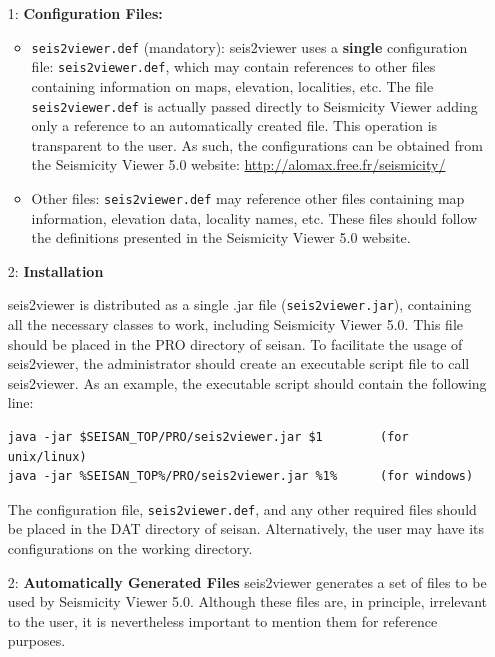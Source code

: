 \begin{enumerate}
\item[1:] \textbf{Configuration Files:}

\begin{itemize}
\item \texttt{seis2viewer.def} (mandatory): seis2viewer uses a \textbf{single} configuration file: \texttt{seis2viewer.def}, which may contain references to other files containing information on maps, elevation, localities, etc. The file \texttt{seis2viewer.def} is actually passed directly to Seismicity Viewer adding only a reference to an automatically created file. This operation is transparent to the user. As such, the configurations can be obtained from the Seismicity Viewer 5.0 website: \url{http://alomax.free.fr/seismicity/}
\item Other files: \texttt{seis2viewer.def} may reference other files containing map information, elevation data, locality names, etc. These files should follow the definitions presented in the Seismicity Viewer 5.0 website.
\end{itemize}


\item[2:] \textbf{Installation}

seis2viewer is distributed as a single .jar file (\texttt{seis2viewer.jar}), containing all the necessary classes to work, including Seismicity Viewer 5.0. This file should be placed in the PRO directory of seisan.
To facilitate the usage of seis2viewer, the administrator should create an executable script file to call seis2viewer. As an example, the executable script should contain the following line:

\begin{verbatim}
java -jar $SEISAN_TOP/PRO/seis2viewer.jar $1        (for unix/linux)
java -jar %SEISAN_TOP%/PRO/seis2viewer.jar %1%      (for windows)
\end{verbatim}

The configuration file, \texttt{seis2viewer.def}, and any other required files should be placed in the DAT directory of seisan. Alternatively, the user may have its configurations on the working directory.

\item[2:] \textbf{Automatically Generated Files}
seis2viewer generates a set of files to be used by Seismicity Viewer 5.0. Although these files are, in principle, irrelevant to the user, it is nevertheless important to mention them for reference purposes.


\end{enumerate}
